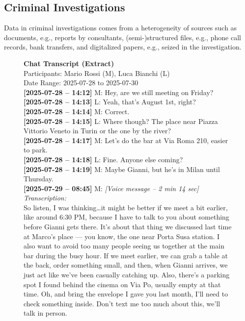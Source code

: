
\cite{BELLANDI2024,pozzi_wise_2025,aixia_2023,Agazzi2025DAVE,real_batini2021semantic}
\subsection{Criminal Investigations}
Data in criminal investigations comes from a heterogeneity of sources such as documents, e.g., reports by consultants, (semi-)structured files, e.g., phone call records, bank transfers, and digitalized papers, e.g., seized in the investigation.


\begin{figure}[htbp]
\centering
\begin{minipage}{0.92\linewidth}
\ttfamily
\small
\textbf{Chat Transcript (Extract)}\\
Participants: Mario Rossi (M), Luca Bianchi (L)\\
Date Range: 2025-07-28 to 2025-07-30\\[0.5em]
\textbf{[2025-07-28 -- 14:12]} M: Hey, are we still meeting on Friday?\\
\textbf{[2025-07-28 -- 14:13]} L: Yeah, that's August 1st, right?\\
\textbf{[2025-07-28 -- 14:14]} M: Correct.\\
\textbf{[2025-07-28 -- 14:15]} L: Where though? The place near Piazza Vittorio Veneto in Turin or the one by the river?\\
\textbf{[2025-07-28 -- 14:17]} M: Let's do the bar at Via Roma 210, easier to park.\\
\textbf{[2025-07-28 -- 14:18]} L: Fine. Anyone else coming?\\
\textbf{[2025-07-28 -- 14:19]} M: Maybe Gianni, but he's in Milan until Thursday.\\[0.5em]
\textbf{[2025-07-29 -- 08:45]} M: \textit{[Voice message -- 2 min 14 sec]}\\
\quad \textit{Transcription:}\\
\quad So listen, I was thinking\dots it might be better if we meet a bit earlier, like around 6:30 PM, because I have to talk to you about something before Gianni gets there. It's about that thing we discussed last time at Marco's place — you know, the one near Porta Susa station. I also want to avoid too many people seeing us together at the main bar during the busy hour. If we meet earlier, we can grab a table at the back, order something small, and then, when Gianni arrives, we just act like we've been casually catching up. Also, there's a parking spot I found behind the cinema on Via Po, usually empty at that time. Oh, and bring the envelope I gave you last month, I'll need to check something inside. Don't text me too much about this, we'll talk in person.\\[0.5em]

\end{minipage}
\end{figure}
